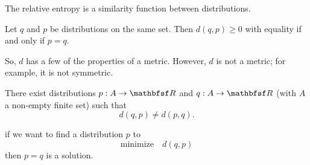 
The relative entropy is a similarity function between distributions.

\begin{prop}

Let $q$ and $p$ be distributions
on the same set.
Then $d(q, p) \geq 0$ with equality if and only if $p = q$.

\end{prop}

So, $d$ has a few of the properties of a metric.
However, $d$ is not a metric; for example, it is not symmetric.

\begin{prop}
  There exist distributions $p: A \to \R$ and $q: A \to \R$ (with $A$ a non-empty finite set) such that $$d(q, p) \neq d(p, q).$$
\end{prop}


if we want to find a distribution $p$
to
\[
  \text{minimize} \quad d(q, p)
\]
then $p = q$ is a solution.
\strats
